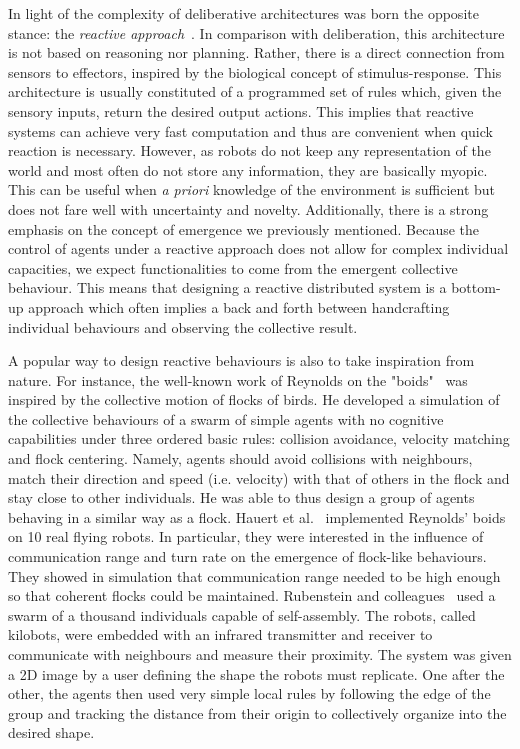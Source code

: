       In light of the complexity of deliberative architectures was born the opposite stance: the \emph{reactive approach}~\parencite{Brooks1986}. In comparison with deliberation, this architecture is not based on reasoning nor planning. Rather, there is a direct connection from sensors to effectors, inspired by the biological concept of stimulus-response. This architecture is usually constituted of a programmed set of rules which, given the sensory inputs, return the desired output actions. This implies that reactive systems can achieve very fast computation and thus are convenient when quick reaction is necessary. However, as robots do not keep any representation of the world and most often do not store any information, they are basically myopic. This can be useful when \emph{a priori} knowledge of the environment is sufficient but does not fare well with uncertainty and novelty. Additionally, there is a strong emphasis on the concept of emergence we previously mentioned. Because the control of agents under a reactive approach does not allow for complex individual capacities, we expect functionalities to come from the emergent collective behaviour. This means that designing a reactive distributed system is a bottom-up approach which often implies a back and forth between handcrafting individual behaviours and observing the collective result.

      A popular way to design reactive behaviours is also to take inspiration from nature. For instance, the well-known work of Reynolds on the "boids"~\parencite{Reynolds1987} was inspired by the collective motion of flocks of birds. He developed a simulation of the collective behaviours of a swarm of simple agents with no cognitive capabilities under three ordered basic rules: collision avoidance, velocity matching and flock centering. Namely, agents should avoid collisions with neighbours, match their direction and speed (i.e. velocity) with that of others in the flock and stay close to other individuals. He was able to thus design a group of agents behaving in a similar way as a flock. Hauert et al.~\parencite{Hauert2011} implemented Reynolds' boids on 10 real flying robots. In particular, they were interested in the influence of communication range and turn rate on the emergence of flock-like behaviours. They showed in simulation that communication range needed to be high enough so that coherent flocks could be maintained. Rubenstein and colleagues~\parencite{Rubenstein2014} used a swarm of a thousand individuals capable of self-assembly. The robots, called kilobots, were embedded with an infrared transmitter and receiver to communicate with neighbours and measure their proximity. The system was given a 2D image by a user defining the shape the robots must replicate. One after the other, the agents then used very simple local rules by following the edge of the group and tracking the distance from their origin to collectively organize into the desired shape.


